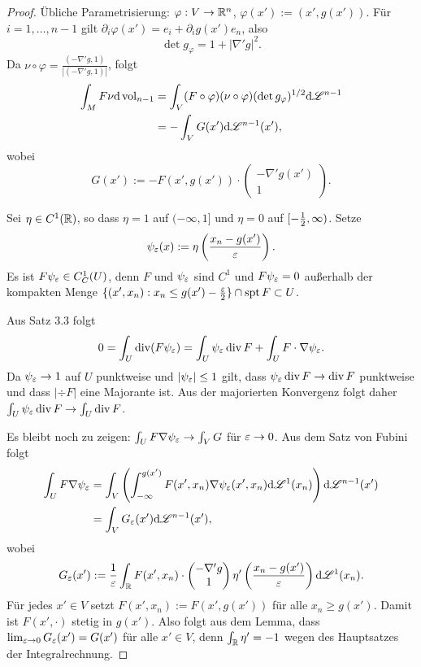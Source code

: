 \begin{proof}
 Übliche Parametrisierung: $\varphi: V \to \mathbb{R}^n$, $\varphi(x') := (x', g(x'))$. Für $i = 1, \ldots, n-1$ gilt $\partial_i \varphi(x') = e_i + \partial_i g(x') e_n$, also
 \[ \det g_\varphi = 1 + | \nabla' g |^2. \]
 Da $\nu \circ \varphi = \frac{(-\nabla' g, 1)}{|(-\nabla' g, 1)|}$, folgt
 \[ \begin{aligned}
     \int_M F \nu \mathrm{d} \operatorname{vol}_{n-1} 
     &= \int_V (F \circ \varphi)(\nu \circ \varphi) (\det g_\varphi)^{1/2} \mathrm{d} \mathscr{L}^{n-1} \\
     &= -\int_V G(x') \mathrm{d} \mathscr{L}^{n-1} (x'),
    \end{aligned} \]
 wobei 
 \[ G(x') := -F(x', g(x') ) \cdot \begin{pmatrix} - \nabla' g(x') \\ 1 \end{pmatrix}. \]
 
 Sei $\eta \in C^1(\mathbb{R})$, so dass $\eta = 1$ auf $(-\infty, 1]$ und $\eta = 0$ auf $[-\frac{1}{2},\infty)$. Setze
 \[ \psi_\varepsilon(x) := \eta \left( \frac{x_n - g(x')}{\varepsilon} \right). \]
 Es ist $F \psi_\varepsilon \in C^1_C(U)$, denn $F$ und $\psi_\varepsilon$ sind $C^1$ und $F \psi_\varepsilon = 0$ außerhalb der kompakten Menge $\{ (x', x_n) : x_n \le g(x') - \frac{\varepsilon}{2} \} \cap \mathrm{spt}\, F \subset U$.
 
 Aus Satz 3.3 folgt
 \[ 0 = \int_U \operatorname{div}( F \psi_\varepsilon ) = \int_U \psi_\varepsilon \operatorname{div} F + \int_U F \cdot \nabla \psi_\varepsilon. \]
 Da $\psi_\varepsilon \to 1$ auf $U$ punktweise und $| \psi_\varepsilon | \le 1$ gilt, dass $\psi_\varepsilon \operatorname{div} F \to \operatorname{div} F$ punktweise und dass $|\div F|$ eine Majorante ist. Aus der majorierten Konvergenz folgt daher $\int_U \psi_\varepsilon \operatorname{div} F \to \int_U \operatorname{div} F$. 
 
 Es bleibt noch zu zeigen: $\int_U F \nabla \psi_\varepsilon \to \int_V G$ für $\varepsilon \to 0$. Aus dem Satz von Fubini folgt
 \[ \begin{aligned} 
    \int_U F \nabla \psi_\varepsilon 
    &= \int_V \left( \int_{-\infty}^{g(x')} F(x', x_n) \nabla \psi_\varepsilon( x', x_n) \mathrm{d} \mathscr{L}^1(x_n) \right) \mathrm{d} \mathscr{L}^{n-1}(x') \\
    &= \int_V G_\varepsilon(x') \mathrm{d} \mathscr{L}^{n-1}(x'),
    \end{aligned} \]
 wobei
 \[ G_\varepsilon(x') := \frac{1}{\varepsilon} \int_{\mathbb{R}} F(x', x_n) \cdot \begin{pmatrix} - \nabla' g \\ 1 \end{pmatrix} \eta' \left( \frac{x_n - g(x')}{\varepsilon} \right) \mathrm{d} \mathscr{L}^1(x_n). \]
 Für jedes $x' \in V$ setzt $F(x',x_n) := F(x', g(x'))$ für alle $x_n \ge g(x')$. Damit ist $F(x', \cdot)$ stetig in $g(x')$. Also folgt aus dem Lemma, dass $\lim_{\varepsilon \to 0} G_\varepsilon(x') = G(x')$ für alle $x' \in V$, denn $\int_{\mathbb{R}} \eta' = -1$ wegen des Hauptsatzes der Integralrechnung. 
 

\end{proof}
